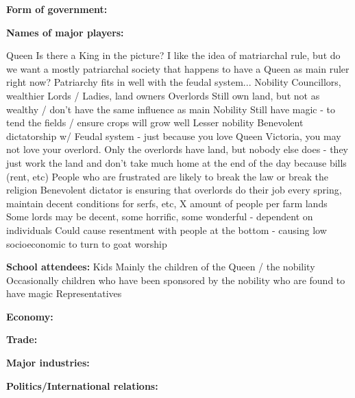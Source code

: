\documentclass[blue]{GL2020}
\begin{document}
\name{\bTest{}}

\textbf{Form of government:}

\textbf{Names of major players:}

Queen 
Is there a King in the picture?  I like the idea of matriarchal rule, but do we want a mostly patriarchal society that happens to have a Queen as main ruler right now?  Patriarchy fits in well with the feudal system...
Nobility
Councillors, wealthier Lords / Ladies, land owners
Overlords
Still own land, but not as wealthy / don’t have the same influence as main Nobility
Still have magic - to tend the fields / ensure crops will grow well
Lesser nobility
Benevolent dictatorship w/ Feudal system - just because you love Queen Victoria, you may not love your overlord.  Only the overlords have land, but nobody else does - they just work the land and don’t take much home at the end of the day because bills (rent, etc)
People who are frustrated are likely to break the law or break the religion
Benevolent dictator is ensuring that overlords do their job every spring, maintain decent conditions for serfs, etc, X amount of people per farm lands
Some lords may be decent, some horrific, some wonderful - dependent on individuals
Could cause resentment with people at the bottom - causing low socioeconomic to turn to goat worship

\textbf{School attendees:}
Kids
Mainly the children of the Queen / the nobility
Occasionally children who have been sponsored by the nobility who are found to have magic
Representatives

\textbf{Economy:}

\textbf{Trade:}

\textbf{Major industries:}

\textbf{Politics/International relations:}
\end{document}
